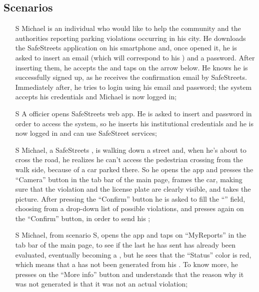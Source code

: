 \documentclass[../../../rasd.tex]{subfiles}
\begin{document}
\subsection{Scenarios\label{sect:3.2.1}}

\begin{itemize}
	\item[S\subs{1}]Michael is an individual who would like to help the community and the authorities reporting parking violations occurring in his city. He downloads the SafeStreets application on his smartphone and, once opened it, he is asked to insert an email (which will correspond to his ) and a password. After inserting them, he accepts the  and taps on the arrow below. He knows he is successfully signed up, as he receives the confirmation email by SafeStreets. Immediately after, he tries to login using his email and password; the system accepts his credentials and Michael is now logged in;
	
	\item[S\subs{2}]A  officier opens SafeStreets web app. He is asked to insert  and password in order to access the system, so he inserts his  institutional credentials and he is now logged in and can use SafeStreet services;
	
	\item[S\subs{3}]Michael, a SafeStreets , is walking down a street and, when he’s about to cross the road, he realizes he can’t access the pedestrian crossing from the walk side, because of a car parked there. So he opens the app and presses the “Camera” button in the tab bar of the main page, frames the car, making sure that the violation and the license plate are clearly visible, and takes the picture. After pressing the “Confirm” button he is asked to fill the “” field, choosing from a drop-down list of possible violations, and presses again on the “Confirm” button, in order to send his ;
	
	\item[S\subs{4}]Michael, from scenario S, opens the app and taps on “MyReports” in the tab bar of the main page, to see if the last  he has sent has already been evaluated, eventually becoming a , but he sees that the  “Status” color is red, which means that a  has not been generated from his . To know more, he presses on the “More info” button and understands that the reason why it was not generated is that it was not an actual violation;
	

\end{itemize}
\end{document}
